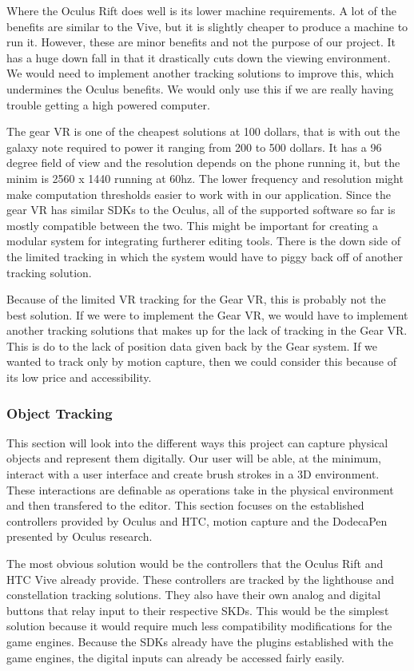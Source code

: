 \documentclass[onecolumn, draftclsnofoot,10pt, compsoc]{IEEEtran}
\newcounter{threesection}[subsubsection]
\begin{document}
Where the Oculus Rift does well is its lower machine requirements. A lot of the benefits are similar to the Vive, but it is slightly cheaper to produce a machine to run it. However, these are minor benefits and not the purpose of our project. It has a huge down fall in that it drastically cuts down the viewing environment. We would need to implement another tracking solutions to improve this, which undermines the Oculus benefits. We would only use this if we are really having trouble getting a high powered computer.

The gear VR is one of the cheapest solutions at 100 dollars, that is with out the galaxy note required to power it ranging from 200 to 500 dollars. It has a 96 degree field of view and the resolution depends on the phone running it, but the minim is 2560 x 1440 running at 60hz. The lower frequency and resolution might make computation thresholds easier to work with in our application. Since the gear VR has similar SDKs to the Oculus, all of the supported software so far is mostly compatible between the two. This might be important for creating a modular system for integrating furtherer editing tools. There is the down side of the limited tracking in which the system would have to piggy back off of another tracking solution.

Because of the limited VR tracking for the Gear VR, this is probably not the best solution. If we were to implement the Gear VR, we would have to implement another tracking solutions that makes up for the lack of tracking in the Gear VR. This is do to the lack of position data given back by the Gear system. If we wanted to track only by motion capture, then we could consider this because of its low price and accessibility. 

\subsubsection{Object Tracking}
This section will look into the different ways this project can capture physical objects and represent them digitally. Our user will be able, at the minimum, interact with a user interface and create brush strokes in a 3D environment. These interactions are definable as operations take in the physical environment and then transfered to the editor. This section focuses on the established controllers provided by Oculus and HTC, motion capture and the DodecaPen presented by Oculus research. 

The most obvious solution would be the controllers that the Oculus Rift and HTC Vive already provide. These controllers are tracked by the lighthouse and constellation tracking solutions. They also have their own analog and digital buttons that relay input to their respective SKDs. This would be the simplest solution because it would require much less compatibility modifications for the game engines. Because the SDKs already have the plugins established with the game engines, the digital inputs can already be accessed fairly easily.
\end{document}
